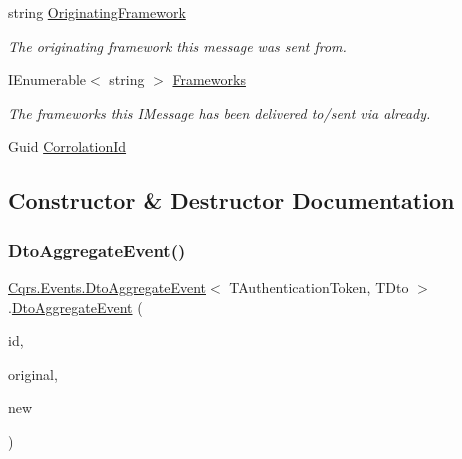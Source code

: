 \begin{DoxyCompactItemize}
\item 
string \hyperlink{classCqrs_1_1Events_1_1DtoAggregateEvent_a40b1390a4f0441deeb1ef766d6903323_a40b1390a4f0441deeb1ef766d6903323}{Originating\+Framework}
\begin{DoxyCompactList}\small\item\em The originating framework this message was sent from. \end{DoxyCompactList}\item 
I\+Enumerable$<$ string $>$ \hyperlink{classCqrs_1_1Events_1_1DtoAggregateEvent_a58aae5cf252106008695c50ffe994517_a58aae5cf252106008695c50ffe994517}{Frameworks}
\begin{DoxyCompactList}\small\item\em The frameworks this I\+Message has been delivered to/sent via already. \end{DoxyCompactList}\item 
Guid \hyperlink{classCqrs_1_1Events_1_1DtoAggregateEvent_acc19ce6f3b8d2070ce31f92a4ad02df2_acc19ce6f3b8d2070ce31f92a4ad02df2}{Corrolation\+Id}
\end{DoxyCompactItemize}


\subsection{Constructor \& Destructor Documentation}
\mbox{\label{classCqrs_1_1Events_1_1DtoAggregateEvent_a9741e3dae73892ee98408547ea953d4d_a9741e3dae73892ee98408547ea953d4d}} 
\subsubsection{\texorpdfstring{Dto\+Aggregate\+Event()}{DtoAggregateEvent()}}
{\footnotesize\ttfamily \hyperlink{classCqrs_1_1Events_1_1DtoAggregateEvent}{Cqrs.\+Events.\+Dto\+Aggregate\+Event}$<$ T\+Authentication\+Token, T\+Dto $>$.\hyperlink{classCqrs_1_1Events_1_1DtoAggregateEvent}{Dto\+Aggregate\+Event} (\begin{DoxyParamCaption}\item[{Guid}]{id,  }\item[{T\+Dto}]{original,  }\item[{T\+Dto @}]{new }\end{DoxyParamCaption})}




